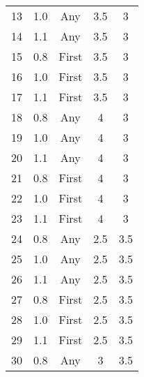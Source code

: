 \begin{table}[H]
{\begin{tabular}{ccccc}
      13                &  1.0  & Any     &     3.5                           & 3                    \\ 
      14                &  1.1  & Any     &     3.5                           & 3                     \\ 
      15                &  0.8  & First   &     3.5                           & 3                   \\ 
      16                &  1.0  & First   &     3.5                           & 3                   \\ 
      17                &  1.1  & First   &     3.5                           & 3                   \\ 
      18                &  0.8  & Any     &     4                           & 3                    \\ 
      19                &  1.0  & Any     &     4                           & 3                    \\ 
      20                &  1.1  & Any     &     4                           & 3                     \\ 
      21                &  0.8  & First   &     4                           & 3                   \\ 
      22                &  1.0  & First   &     4                           & 3                   \\ 
      23                &  1.1  & First   &     4                           & 3                   \\ 
      24                &  0.8  & Any     &     2.5                           & 3.5                    \\ 
      25                &  1.0  & Any     &     2.5                           & 3.5                    \\ 
      26                &  1.1  & Any     &     2.5                           & 3.5                     \\ 
      27                &  0.8  & First   &     2.5                           & 3.5                   \\ 
      28                &  1.0  & First   &     2.5                           & 3.5                   \\ 
      29                &  1.1  & First   &     2.5                           & 3.5                   \\ 
      30                &  0.8  & Any     &     3                           & 3.5                    \\ 

\end{tabular}}
\end{table}
